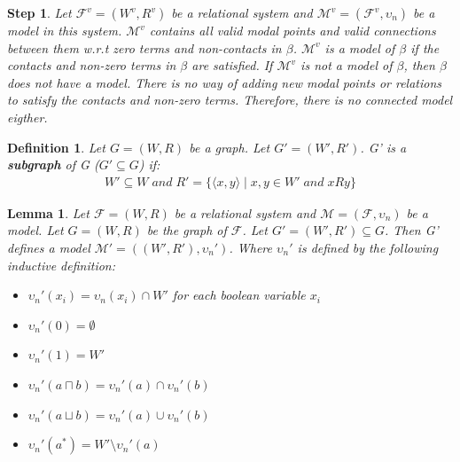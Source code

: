 \documentclass{article}
\newcommand\M{\mathcal{M}}
\newcommand\F{\mathcal{F}}
\newtheorem{lemma}[theorem]{Lemma}
\newtheorem{defn}[theorem]{Definition}
\newtheorem{step}[theorem]{Step}
\newcommand{\pair}[2]{ \langle #1, #2 \rangle }
\newcommand{\pairXY}{ \pair{x}{y} }
\begin{document}
		\begin{step}
			Let $\F^v = (W^v, R^v)$ be a relational system and $\M^v = (\F^v, \upsilon_n)$ be a model in this system. $\M^v$ contains all valid modal points and valid connections between them w.r.t zero terms and non-contacts in $\beta$. $\M^v$ is a model of $\beta$ if the contacts and non-zero terms in $\beta$ are satisfied. If $\M^v$ is not a model of $\beta$, then $\beta$ does not have a model. There is no way of adding new modal points or relations to satisfy the contacts and non-zero terms. Therefore, there is no connected model eigther.
		\end{step}

	\begin{defn}\label{subgraph}
		Let $G=(W, R)$ be a graph. Let $G'=(W', R')$. G' is a \textbf{subgraph} of G ($G' \subseteq G$) if:
		\begin{align*}
			W' \subseteq W \; and \; R' =  \{ \pairXY  \mid x, y \in W' \; and \; xRy  \}
		\end{align*}
	\end{defn}

	\begin{lemma}\label{model-from-graph}
		Let $\F = (W, R)$ be a relational system and $\M = (\F, \upsilon_n)$ be a model. Let $G=(W, R)$ be the graph of $\F$. Let $G'=(W',R') \subseteq G$. Then G' defines a model $\M' = ((W', R'), \upsilon_n')$. Where $\upsilon_n'$ is defined by the following inductive definition:
		\begin{itemize}
			\item $\upsilon_n'(x_i) = \upsilon_n(x_i) \cap W'$ for each boolean variable $x_i$
			\item $\upsilon_n'(0) = \emptyset$
			\item $\upsilon_n'(1) = W'$
			\item $\upsilon_n'(a \sqcap b) = \upsilon_n'(a) \cap \upsilon_n'(b)$
			\item $\upsilon_n'(a \sqcup b) = \upsilon_n'(a) \cup \upsilon_n'(b)$
			\item $\upsilon_n'(a^*) = W' \setminus \upsilon_n'(a)$
		\end{itemize}
	\end{lemma}
\end{document}
